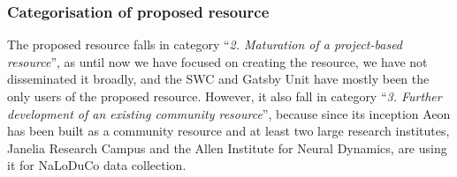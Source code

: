 \subsubsection{Categorisation of proposed resource}

The proposed resource falls in category ``\emph{2. Maturation of a
project-based resource}'', as until now we have focused on creating the
resource, we have not disseminated it broadly, and the SWC and Gatsby Unit have
mostly been the only users of the proposed resource.
%
However, it also fall in category ``\emph{3. Further development of an existing
community resource}'', because since its inception Aeon has been built as a
community resource and at least two large research institutes, Janelia Research
Campus and the Allen Institute for Neural Dynamics, are using it for NaLoDuCo
data collection.
